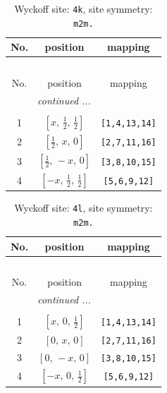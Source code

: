 \documentclass[fleqn,8pt]{jsarticle}
\begin{document}
\renewcommand{\arraystretch}{1.2}
\begin{longtable}{ccc}
\caption{Wyckoff site: {\tt 4k}, site symmetry: {\tt m2m.}}
 \\
 \hline \hline
No. & position & mapping \\ \hline \endfirsthead

\multicolumn{2}{l}{\tablename\ \thetable{}} \\
 \hline \hline
No. & position & mapping \\ \hline \endhead

 \hline \hline
\multicolumn{2}{r}{\footnotesize\it continued ...} \\ \endfoot

 \hline \hline
\multicolumn{2}{r}{} \\ \endlastfoot

1 & $\left[ x,\, \frac{1}{2},\, \frac{1}{2} \right]$ & {\tt [1,4,13,14]} \\ \hline
2 & $\left[ \frac{1}{2},\, x,\, 0 \right]$ & {\tt [2,7,11,16]} \\ \hline
3 & $\left[ \frac{1}{2},\, - x,\, 0 \right]$ & {\tt [3,8,10,15]} \\ \hline
4 & $\left[ - x,\, \frac{1}{2},\, \frac{1}{2} \right]$ & {\tt [5,6,9,12]} \\
\end{longtable}
\renewcommand{\arraystretch}{1.2}
\begin{longtable}{ccc}
\caption{Wyckoff site: {\tt 4l}, site symmetry: {\tt m2m.}}
 \\
 \hline \hline
No. & position & mapping \\ \hline \endfirsthead

\multicolumn{2}{l}{\tablename\ \thetable{}} \\
 \hline \hline
No. & position & mapping \\ \hline \endhead

 \hline \hline
\multicolumn{2}{r}{\footnotesize\it continued ...} \\ \endfoot

 \hline \hline
\multicolumn{2}{r}{} \\ \endlastfoot

1 & $\left[ x,\, 0,\, \frac{1}{2} \right]$ & {\tt [1,4,13,14]} \\ \hline
2 & $\left[ 0,\, x,\, 0 \right]$ & {\tt [2,7,11,16]} \\ \hline
3 & $\left[ 0,\, - x,\, 0 \right]$ & {\tt [3,8,10,15]} \\ \hline
4 & $\left[ - x,\, 0,\, \frac{1}{2} \right]$ & {\tt [5,6,9,12]} \\
\end{longtable}
\end{document}
